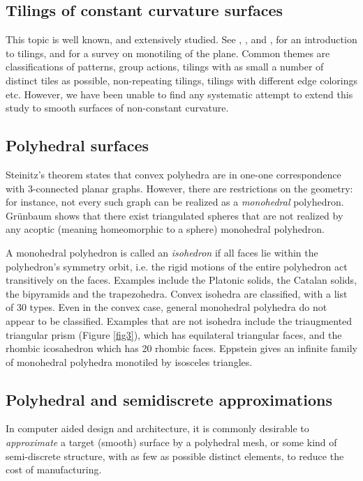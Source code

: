 \documentclass[11pt]{amsart}
\theoremstyle{remark}
\newcounter{case}
\begin{document}
\subsection{Tilings of constant curvature surfaces}
This topic is well known, and extensively studied.  See \cite{grunbaum1987tilings}, \cite{schulte1993tilings}, \cite{toth2017handbook} and \cite{adams2023tiling}, for an introduction to tilings,  and \cite{zong2020can} for a survey on monotiling of the plane.
Common themes are classifications of patterns, group actions, tilings with as small a number of distinct tiles as possible,  non-repeating tilings, tilings with different edge colorings etc. However,  we have been unable to find any systematic attempt to extend this study to smooth surfaces of non-constant curvature.

\subsection{Polyhedral surfaces}
Steinitz's theorem states that convex polyhedra are in one-one correspondence with 3-connected planar graphs. 
However, there are restrictions on the geometry: for instance, not every such graph can be realized as a \emph{monohedral} polyhedron.  Gr\"unbaum \cite{grunbaum2001convex} shows that there exist triangulated spheres that are not realized by any acoptic (meaning homeomorphic to a sphere) monohedral polyhedron.

A monohedral polyhedron is called an \emph{isohedron} if all faces lie within the polyhedron's symmetry orbit, i.e. the rigid motions of the entire polyhedron act transitively on the faces.  Examples include the Platonic solids, the Catalan solids, the bipyramids and the trapezohedra. 
Convex isohedra  are classified, with a list of 30 types.
Even in the convex case,  general monohedral polyhedra do not appear to be classified.
Examples that are not isohedra include the triaugmented triangular prism (Figure \ref{fig3}),  which has equilateral triangular faces,  and the rhombic icosahedron
which has 20 rhombic faces.
 Eppstein \cite{eppstein2021polyhedral} gives an infinite family of monohedral polyhedra monotiled by isosceles triangles.


\subsection{Polyhedral and semidiscrete approximations} \label{sec:approximations}
 In computer aided design and architecture, it is commonly desirable to \emph{approximate} a target (smooth) surface by a polyhedral mesh, or some kind of
semi-discrete structure,  with as few as possible distinct elements, to reduce the cost of manufacturing.
\end{document}

